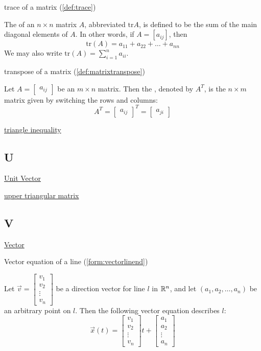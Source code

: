 \documentclass{ximera}
\begin{document}
trace of a matrix (\ref{def:trace})
\begin{expandable}
    The  of an $n \times n$ matrix $A$, abbreviated $\mbox{tr} A$, is defined to be the sum of the main diagonal elements of $A$.  In other words, if $ A = [a_{ij}]$, then $$\mbox{tr}(A) = a_{11} + a_{22} + \dots + a_{nn}$$  We may also write $\mbox{tr}(A) =\sum_{i=1}^n a_{ii}$.
\end{expandable}

transpose of a matrix (\ref{def:matrixtranspose})
\begin{expandable}
    Let $A=\begin{bmatrix} a _{ij}\end{bmatrix}$ be an $m\times n$ matrix. Then the , denoted by $A^{T}$, is the $n\times m$
matrix given by switching the rows and columns:
\begin{equation*}
A^{T} = \begin{bmatrix} a _{ij}\end{bmatrix}^{T}= \begin{bmatrix} a_{ji} \end{bmatrix}
\end{equation*}
\end{expandable}

\href{https://ximera.osu.edu/oerlinalg/LinearAlgebra/APX-0010/main}{triangle inequality}

\subsection{U}
\href{https://ximera.osu.edu/oerlinalg/LinearAlgebra/VEC-0036/main}{Unit Vector}

\href{https://ximera.osu.edu/oerlinalg/LinearAlgebra/MAT-0070/main}{upper triangular matrix}

\subsection{V}
\href{https://ximera.osu.edu/oerlinalg/LinearAlgebra/VEC-0010/main}{Vector}

Vector equation of a line (\ref{form:vectorlinend})
\begin{expandable}
    Let $\vec{v}=\begin{bmatrix}v_1\\v_2\\\vdots\\v_n\end{bmatrix}$ be a direction vector for line $l$ in $\mathbb{R}^n$, and let $(a_1, a_2,\ldots , a_n)$ be an arbitrary point on $l$.  Then the following vector equation describes $l$:
$$\vec{x}(t)=\begin{bmatrix}v_1\\v_2\\\vdots\\v_n\end{bmatrix}t+\begin{bmatrix}a_1\\a_2\\\vdots\\a_n\end{bmatrix}$$
\end{expandable}
\end{document}
